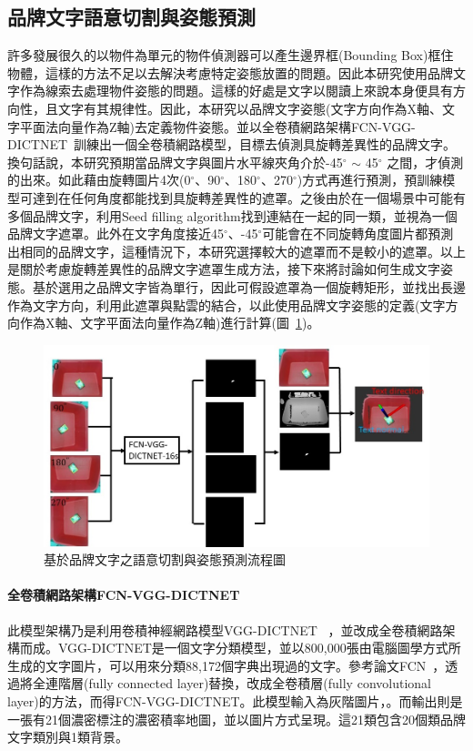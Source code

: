 \subsection{品牌文字語意切割與姿態預測}
許多發展很久的以物件為單元的物件偵測器可以產生邊界框(Bounding Box)框住物體，這樣的方法不足以去解決考慮特定姿態放置的問題。因此本研究使用品牌文字作為線索去處理物件姿態的問題。這樣的好處是文字以閱讀上來說本身便具有方向性，且文字有其規律性。因此，本研究以品牌文字姿態(文字方向作為X軸、文字平面法向量作為Z軸)去定義物件姿態。並以全卷積網路架構FCN-VGG-DICTNET~\cite{peterthesis}訓練出一個全卷積網路模型，目標去偵測具旋轉差異性的品牌文字。換句話說，本研究預期當品牌文字與圖片水平線夾角介於-45$^{\circ}$ $\sim$ 45$^{\circ}$ 之間，才偵測的出來。如此藉由旋轉圖片4次(0$^{\circ}$、90$^{\circ}$、180$^{\circ}$、270$^{\circ}$)方式再進行預測，預訓練模型可達到在任何角度都能找到具旋轉差異性的遮罩。之後由於在一個場景中可能有多個品牌文字，利用Seed filling algorithm找到連結在一起的同一類，並視為一個品牌文字遮罩。此外在文字角度接近45$^{\circ}$、-45$^{\circ}$可能會在不同旋轉角度圖片都預測出相同的品牌文字，這種情況下，本研究選擇較大的遮罩而不是較小的遮罩。以上是關於考慮旋轉差異性的品牌文字遮罩生成方法，接下來將討論如何生成文字姿態。基於選用之品牌文字皆為單行，因此可假設遮罩為一個旋轉矩形，並找出長邊作為文字方向，利用此遮罩與點雲的結合，以此使用品牌文字姿態的定義(文字方向作為X軸、文字平面法向量作為Z軸)進行計算(圖~\ref{figure:text-pose-extimation-pipeline})。

\begin{figure}[H]
	\centering
	\includegraphics[height=!, width=1.0\linewidth, keepaspectratio=true]
	{./figures/text-pose-extimation-pipeline.jpg}
  \caption{基於品牌文字之語意切割與姿態預測流程圖}
  \label{figure:text-pose-extimation-pipeline}
\end{figure}

\paragraph{全卷積網路架構FCN-VGG-DICTNET}
此模型架構乃是利用卷積神經網路模型VGG-DICTNET ~\cite{jaderberg2014synthetic}，並改成全卷積網路架構而成。VGG-DICTNET是一個文字分類模型，並以800,000張由電腦圖學方式所生成的文字圖片，可以用來分類88,172個字典出現過的文字。參考論文FCN~\cite{long2015fully}，透過將全連階層(fully connected layer)替換，改成全卷積層(fully convolutional layer)的方法，而得FCN-VGG-DICTNET。此模型輸入為灰階圖片，。而輸出則是一張有21個濃密標注的濃密積率地圖，並以圖片方式呈現。這21類包含20個類品牌文字類別與1類背景。

